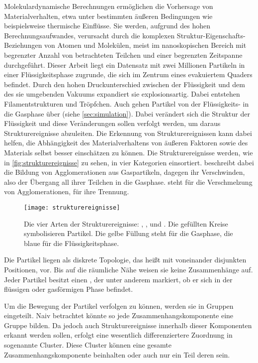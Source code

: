 Molekulardynamische Berechnungen ermöglichen die Vorhersage von Materialverhalten, etwa unter bestimmten äußeren Bedingungen wie beispielsweise thermische Einflüsse. Sie werden, aufgrund des hohen Berechnungsaufwandes, verursacht durch die komplexen Struktur-Eigenschafts-Beziehungen von Atomen und Molekülen, meist im nanoskopischen Bereich mit begrenzter Anzahl von betrachteten Teilchen und einer begrenzten Zeitspanne durchgeführt. Dieser Arbeit liegt ein Datensatz mit zwei Millionen Partikeln in einer Flüssigkeitsphase zugrunde, die sich im Zentrum eines evakuiertem Quaders befindet. Durch den hohen Druckunterschied zwischen der Flüssigkeit und dem des sie umgebenden Vakuums expandiert sie explosionsartig. Dabei entstehen Filamentstrukturen und Tröpfchen. Auch gehen Partikel von der Flüssigkeits- in die Gasphase über (siehe \autoref{sec:simulation}). Dabei verändert sich die Struktur der Flüssigkeit und diese Veränderungen sollen verfolgt werden, um daraus Strukturereignisse abzuleiten. Die Erkennung von Strukturereignissen kann dabei helfen, die Abhängigkeit des Materialverhaltens von äußeren Faktoren sowie des Materials selbst besser einschätzen zu können. Die Strukturereignisse werden, wie in \autoref{fig:strukturereignisse} zu sehen, in vier Kategorien einsortiert.  beschreibt dabei die Bildung von Agglomerationen aus Gaspartikeln,  dagegen ihr Verschwinden, also der Übergang all ihrer Teilchen in die Gasphase.  steht für die Verschmelzung von Agglomerationen,  für ihre Trennung.

\begin{figure}
	\texttt{[image: strukturereignisse]}
	\caption{Die vier Arten der Strukturereignisse: , ,  und . Die gefüllten Kreise symbolisieren Partikel. Die gelbe Füllung steht für die Gasphase, die blaue für die Flüssigkeitsphase.}\label{fig:strukturereignisse}
\end{figure}

Die Partikel liegen als diskrete Topologie, das heißt mit voneinander disjunkten Positionen, vor. Bis auf die räumliche Nähe weisen sie keine Zusammenhänge auf. Jeder Partikel besitzt einen , der unter anderem markiert, ob er sich in der flüssigen oder gasförmigen Phase befindet.

Um die Bewegung der Partikel verfolgen zu können, werden sie in Gruppen eingeteilt. Naiv betrachtet könnte so jede Zusammenhangskomponente eine Gruppe bilden. Da jedoch auch Strukturereignisse innerhalb dieser Komponenten erkannt werden sollen, erfolgt eine wesentlich differenziertere Zuordnung in sogenannte Cluster. Diese Cluster können eine gesamte Zusammenhangskomponente beinhalten oder auch nur ein Teil deren sein.

